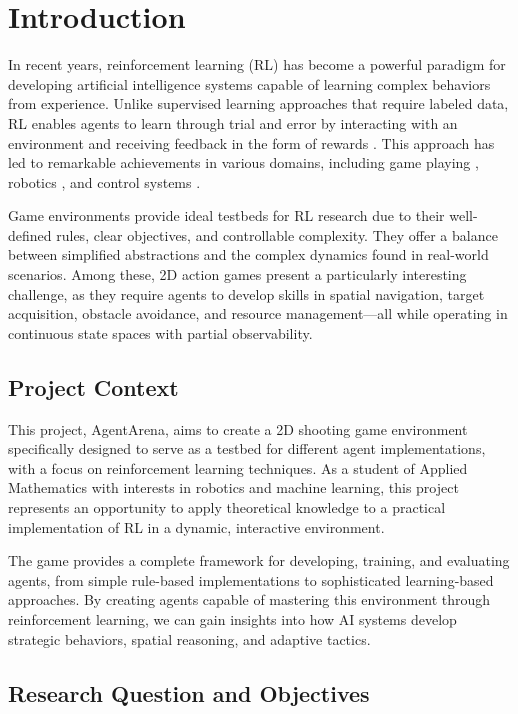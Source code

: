 \section{Introduction}

In recent years, reinforcement learning (RL) has become a powerful paradigm for developing artificial intelligence systems capable of learning complex behaviors from experience. Unlike supervised learning approaches that require labeled data, RL enables agents to learn through trial and error by interacting with an environment and receiving feedback in the form of rewards \cite{sutton2018reinforcement}. This approach has led to remarkable achievements in various domains, including game playing \cite{mnih2015human, silver2017mastering}, robotics \cite{kober2013reinforcement}, and control systems \cite{lillicrap2015continuous}.

Game environments provide ideal testbeds for RL research due to their well-defined rules, clear objectives, and controllable complexity. They offer a balance between simplified abstractions and the complex dynamics found in real-world scenarios. Among these, 2D action games present a particularly interesting challenge, as they require agents to develop skills in spatial navigation, target acquisition, obstacle avoidance, and resource management—all while operating in continuous state spaces with partial observability.

\subsection{Project Context}

This project, AgentArena, aims to create a 2D shooting game environment specifically designed to serve as a testbed for different agent implementations, with a focus on reinforcement learning techniques. As a student of Applied Mathematics with interests in robotics and machine learning, this project represents an opportunity to apply theoretical knowledge to a practical implementation of RL in a dynamic, interactive environment.

The game provides a complete framework for developing, training, and evaluating agents, from simple rule-based implementations to sophisticated learning-based approaches. By creating agents capable of mastering this environment through reinforcement learning, we can gain insights into how AI systems develop strategic behaviors, spatial reasoning, and adaptive tactics.

\subsection{Research Question and Objectives}

